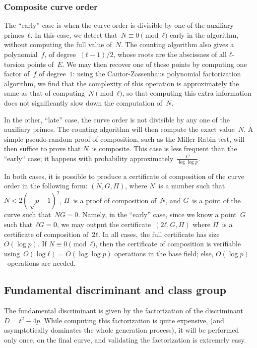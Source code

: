 \documentclass{article}
\begin{document}
\subsubsection{Composite curve order}

The “early” case is when the curve order is
divisible by one of the auxiliary primes~$ℓ$.
In this case, we detect that~$N ≡ 0 \pmod{ℓ}$ early in the algorithm,
without computing the full value of~$N$.
The counting algorithm also gives a polynomial~$f$, of degree~$(ℓ-1)/2$,
whose roots are the abscissaes of all $ℓ$-torsion points of~$E$.
We may then recover one of these points by
computing one factor of~$f$ of degree~$1$:
using the Cantor-Zassenhaus polynomial factorization algorithm,
we find that the complexity of this operation
is approximately the same as that of computing~$N \pmod{ℓ}$,
so that computing this extra information
does not significantly slow down the computation of~$N$.

\smallskip

In the other, “late” case, the curve order is not divisible
by any one of the auxiliary primes.
The counting algorithm will then compute the exact value~$N$.
A simple pseudo-random proof of composition,
such as the Miller-Rabin test,
will then suffice to prove that $N$~is composite.
This case is less frequent than the “early“ case;
it happens with probability approximately~$\frac{C}{\log \log p}$.

\smallskip

In both cases, it is possible to produce a certificate of composition
of the curve order in the following form: $(N, G, Π)$,
where $N$~is a number such that~$N < 2 (√p - 1)^2$,
$Π$~is a proof of composition of~$N$,
and $G$~is a point of the curve such that~$N G = 0$.
Namely, in the “early” case, since we know a point~$G$ such that~$ℓ G = 0$,
we may output the certificate~$(2 ℓ, G, Π)$
where $Π$~is a certificate of composition of~$2 ℓ$.
In all cases, the full certificate has size~$O(\log p)$.
If $N ≡ 0 \pmod{ℓ}$, then the certificate of composition
is verifiable using~$O(\log ℓ) = O(\log \log p)$ operations in the base field;
else, $O(\log p)$~operations are needed.


\subsection{Fundamental discriminant and class group}

The fundamental discriminant is given by
the factorization of the discriminant~$D = t^2 - 4 p$.
While computing this factorization is quite expensive,
(and asymptotically dominates the whole generation process),
it will be performed only once, on the final curve,
and validating the factorization is extremely easy.
\end{document}
